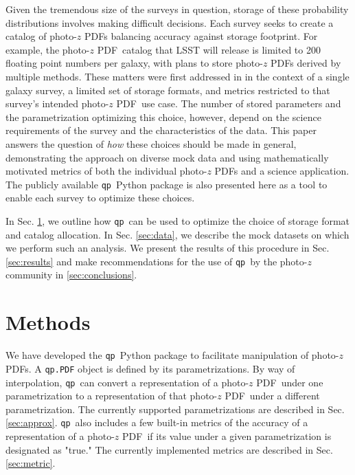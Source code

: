 \documentclass[\docopts]{\docclass}
\newcommand{\qp}{\texttt{qp}}
\newcommand{\pz}{photo-$z$ PDF}
\begin{document}
Given the tremendous size of the surveys in question, storage of these 
probability distributions involves making difficult decisions.  Each survey 
seeks to create a catalog of \pz s balancing accuracy against storage 
footprint.  For example, the \pz\ catalog that LSST will release is limited to 
200 floating point numbers per galaxy, with plans to store \pz s derived by 
multiple methods.  \citep{juric_data_2017}
These matters were first addressed in \citet{carrasco_kind_sparse_2014} in the 
context of a single galaxy survey, a limited set of storage formats, and 
metrics restricted to that survey's intended \pz\ use case.  The number of 
stored parameters and the parametrization optimizing this choice, however, 
depend on the science requirements of the survey and the characteristics of the 
data.  This paper answers the question of \textit{how} these choices should be 
made in general, demonstrating the approach on diverse mock data and using 
mathematically motivated metrics of both the individual \pz s and a science 
application.  The publicly available \qp\ Python package is also presented here 
as a tool to enable each survey to optimize these choices.

In Sec. \ref{sec:methods}, we outline how \qp\ can be used to optimize the 
choice of storage format and catalog allocation.  In Sec. \ref{sec:data}, we 
describe the mock datasets on which we perform such an analysis.  We present 
the results of this procedure in Sec. \ref{sec:results} and make 
recommendations for the use of \qp\ by the photo-$z$ community in 
\ref{sec:conclusions}.








\section{Methods}
\label{sec:methods}



We have developed the \qp\ Python package to facilitate manipulation of \pz s.  
A \texttt{qp.PDF} object is defined by its parametrizations.  By way of 
interpolation, \qp\ can convert a representation of a \pz\ under one 
parametrization to a representation of that \pz\ under a different 
parametrization.  The currently supported parametrizations are described in 
Sec. \ref{sec:approx}.  \qp\ also includes a few built-in metrics of the 
accuracy of a representation of a \pz\ if its value under a given 
parametrization is designated as "true."  The currently implemented metrics are 
described in Sec. \ref{sec:metric}.
\end{document}
